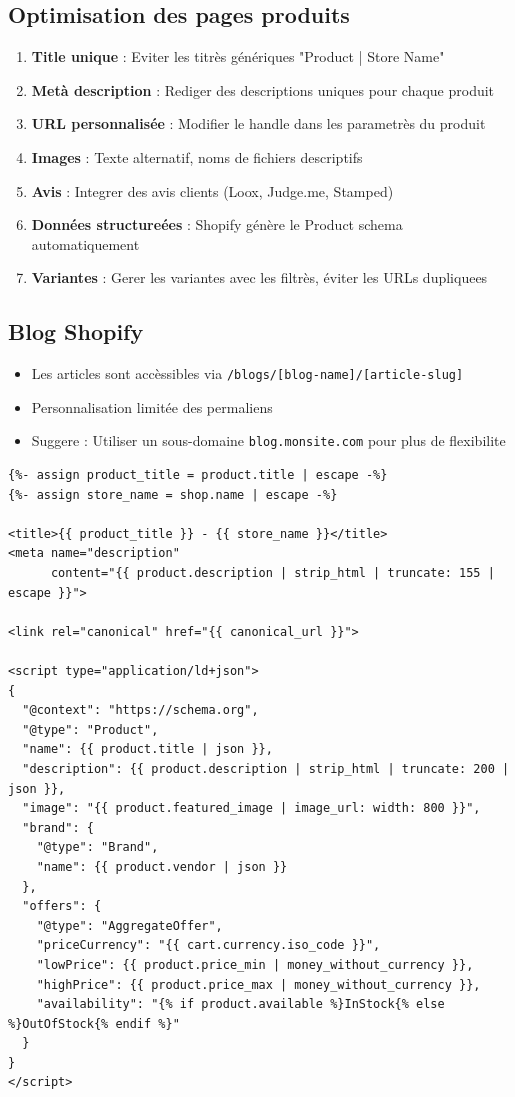 \documentclass[12pt,a4paper,twoside]{report}
\begin{document}
\subsection{Optimisation des pages produits}

\begin{enumerate}
    \item \textbf{Title unique} : Eviter les titrès génériques "Product | Store Name"
    \item \textbf{Metà description} : Rediger des descriptions uniques pour chaque produit
    \item \textbf{URL personnalisée} : Modifier le handle dans les parametrès du produit
    \item \textbf{Images} : Texte alternatif, noms de fichiers descriptifs
    \item \textbf{Avis} : Integrer des avis clients (Loox, Judge.me, Stamped)
    \item \textbf{Données structureées} : Shopify génère le Product schema automatiquement
    \item \textbf{Variantes} : Gerer les variantes avec les filtrès, éviter les URLs dupliquees
\end{enumerate}

\subsection{Blog Shopify}

\begin{itemize}
    \item Les articles sont accèssibles via \texttt{/blogs/[blog-name]/[article-slug]}
    \item Personnalisation limitée des permaliens
    \item Suggere : Utiliser un sous-domaine \texttt{blog.monsite.com} pour plus de flexibilite
\end{itemize}

\begin{lstlisting}[style=htmlcode,caption={Template Liquid Shopify optimisé pour SEO}]
{%- assign product_title = product.title | escape -%}
{%- assign store_name = shop.name | escape -%}

<title>{{ product_title }} - {{ store_name }}</title>
<meta name="description"
      content="{{ product.description | strip_html | truncate: 155 | escape }}">

<link rel="canonical" href="{{ canonical_url }}">

<script type="application/ld+json">
{
  "@context": "https://schema.org",
  "@type": "Product",
  "name": {{ product.title | json }},
  "description": {{ product.description | strip_html | truncate: 200 | json }},
  "image": "{{ product.featured_image | image_url: width: 800 }}",
  "brand": {
    "@type": "Brand",
    "name": {{ product.vendor | json }}
  },
  "offers": {
    "@type": "AggregateOffer",
    "priceCurrency": "{{ cart.currency.iso_code }}",
    "lowPrice": {{ product.price_min | money_without_currency }},
    "highPrice": {{ product.price_max | money_without_currency }},
    "availability": "{% if product.available %}InStock{% else %}OutOfStock{% endif %}"
  }
}
</script>
\end{lstlisting}
\end{document}
